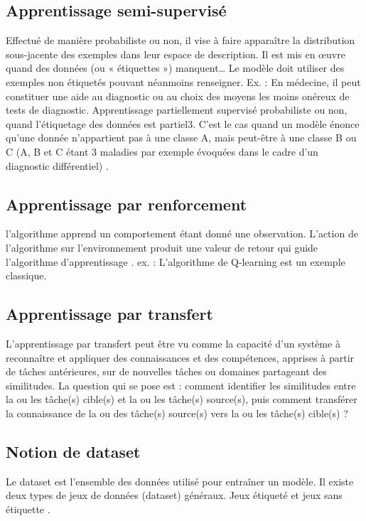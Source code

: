 \documentclass[12pt, french]{report}
\begin{document}
\subsection{Apprentissage semi-supervisé}
Effectué de manière probabiliste ou non, il vise à faire apparaître la distribution sous-jacente des exemples dans leur espace de description. Il est mis en œuvre quand des données (ou « étiquettes ») manquent… Le modèle doit utiliser des exemples non étiquetés pouvant néanmoins renseigner.
Ex. : En médecine, il peut constituer une aide au diagnostic ou au choix des moyens les moins onéreux de tests de diagnostic.
Apprentissage partiellement supervisé 
probabiliste ou non, quand l'étiquetage des données est partiel3. C'est le cas quand un modèle énonce qu'une donnée n'appartient pas à une classe A, mais peut-être à une classe B ou C (A, B et C étant 3 maladies par exemple évoquées dans le cadre d'un diagnostic différentiel) \cite{key13}.
\subsection{Apprentissage par renforcement}l'algorithme apprend un comportement étant donné une observation. L'action de l'algorithme sur l'environnement produit une valeur de retour qui guide l'algorithme d'apprentissage \cite{key13}.
ex. : L'algorithme de Q-learning est un exemple classique.
\subsection{Apprentissage par transfert}
L’apprentissage par transfert peut être vu comme la capacité d’un système à reconnaître et appliquer des connaissances et des compétences, apprises à partir de tâches antérieures, sur de nouvelles tâches ou domaines partageant des similitudes. La question qui se pose est : comment identifier les similitudes entre la ou les tâche(s) cible(s) et la ou les tâche(s) source(s), puis comment transférer la connaissance de la ou des tâche(s) source(s) vers la ou les tâche(s) cible(s) ? \cite{key13}
\subsection{Notion de dataset}
Le dataset est l'ensemble des données utilisé pour entraîner un modèle. Il existe deux types de jeux de données (dataset) généraux. Jeux étiqueté et jeux sans étiquette \cite{key15}.
\end{document}

